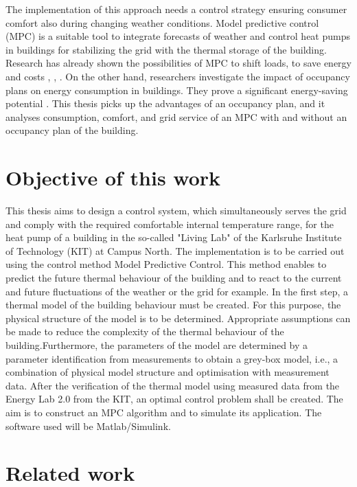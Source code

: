 \newline
The implementation of this approach needs a control strategy ensuring consumer comfort also during changing weather conditions. Model predictive control (MPC)  is a suitable tool to integrate forecasts of weather and control heat pumps in buildings for stabilizing the grid with the thermal storage of the building. Research has already shown the possibilities of MPC to shift loads, to save energy and costs \cite{Oldewurtel.2010}, \cite{Hazyuk.2012b}, \cite{Zwickel.2019}.
On the other hand, researchers investigate the impact of occupancy plans on energy consumption in buildings. They prove a significant energy-saving potential \cite{Wang.2019}. This thesis picks up the advantages of an occupancy plan, and it analyses consumption, comfort, and grid service of an MPC with and without an occupancy plan of the building.
 

\section{Objective of this work}
\label{section:obejective}
    This thesis aims to design a control system, which simultaneously serves the grid and comply with the required comfortable internal temperature range, for the heat pump of a building in the so-called "Living Lab" of the Karlsruhe Institute of Technology (KIT)  at Campus North. The implementation is to be carried out using the control method Model Predictive Control. This method enables to predict the future thermal behaviour of the building and to react to the current and future fluctuations of the weather or the grid for example. 
    In the first step, a thermal model of the building behaviour must be created. For this purpose, the physical structure of the model is to be determined. Appropriate assumptions can be made to reduce the complexity of the thermal behaviour of the building.Furthermore, the parameters of the model are determined by a parameter identification from measurements to obtain a grey-box model, i.e., a combination of physical model structure and optimisation with measurement data. After the verification of the thermal model using measured data from the Energy Lab 2.0 from the KIT, an optimal control problem shall be created. The aim is to construct an MPC algorithm and to simulate its application. The software used will be Matlab/Simulink.

\section{Related work}
\label{section:relatedwork}

